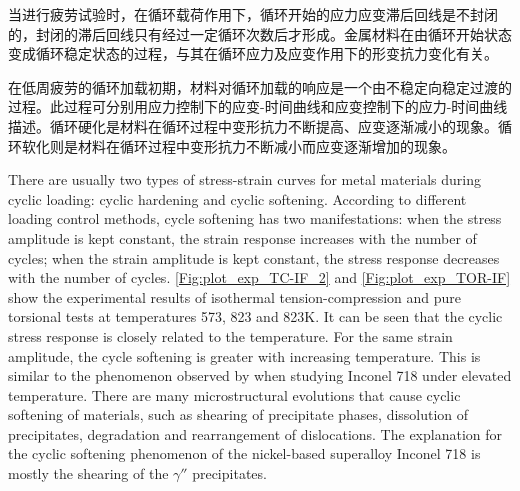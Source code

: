 当进行疲劳试验时，在循环载荷作用下，循环开始的应力应变滞后回线是不封闭的，封闭的滞后回线只有经过一定循环次数后才形成。金属材料在由循环开始状态变成循环稳定状态的过程，与其在循环应力及应变作用下的形变抗力变化有关。

在低周疲劳的循环加载初期，材料对循环加载的响应是一个由不稳定向稳定过渡的过程。此过程可分别用应力控制下的应变-时间曲线和应变控制下的应力-时间曲线描述。循环硬化是材料在循环过程中变形抗力不断提高、应变逐渐减小的现象。循环软化则是材料在循环过程中变形抗力不断减小而应变逐渐增加的现象。

There are usually two types of stress-strain curves for metal materials during cyclic loading: cyclic hardening and cyclic softening.
According to different loading control methods, cycle softening has two manifestations: when the stress amplitude is kept constant, the strain response increases with the number of cycles; when the strain amplitude is kept constant, the stress response decreases with the number of cycles.
\ref{Fig:plot_exp_TC-IF_2} and \ref{Fig:plot_exp_TOR-IF} show the experimental results of isothermal tension-compression and pure torsional tests at temperatures 573, 823 and 823K. It can be seen that the cyclic stress response is closely related to the temperature. For the same strain amplitude, the cycle softening is greater with increasing temperature. This is similar to the phenomenon observed by \cite{Fournier1977,Xiao2005,kim1988elevated,Schlesinger2017} when studying Inconel 718 under elevated temperature.
There are many microstructural evolutions that cause cyclic softening of materials, such as shearing of precipitate phases, dissolution of precipitates, degradation and rearrangement of dislocations.
The explanation for the cyclic softening phenomenon of the nickel-based superalloy Inconel 718 is mostly the shearing  of the $\gamma ''$ precipitates.


